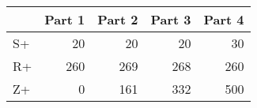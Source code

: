 \begin{tabular}{lrrrr}
\toprule
 & Part 1 & Part 2 & Part 3 & Part 4 \\
\midrule
S+ & 20 & 20 & 20 & 30 \\
R+ & 260 & 269 & 268 & 260 \\
Z+ & 0 & 161 & 332 & 500 \\
\bottomrule
\end{tabular}
